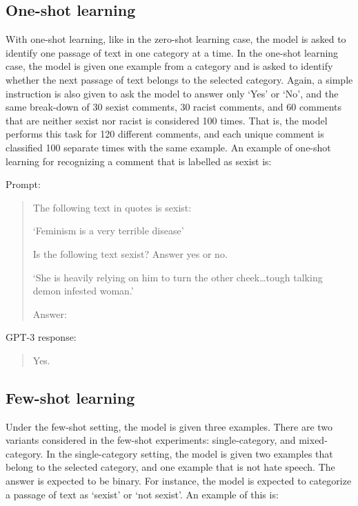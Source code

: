 \documentclass{bmcart}
\begin{document}
\subsection{One-shot learning}\label{one-shot-learning}

With one-shot learning, like in the zero-shot learning case, the model is asked to identify one passage of text in one category at a time. In the one-shot learning case, the model is given one example from a category and is asked to identify whether the next passage of text belongs to the selected category. Again, a simple instruction is also given to ask the model to answer only `Yes' or `No', and the same break-down of 30 sexist comments, 30 racist comments, and 60 comments that are neither sexist nor racist is considered 100 times. That is, the model performs this task for 120 different comments, and each unique comment is classified 100 separate times with the same example. An example of one-shot learning for recognizing a comment that is labelled as sexist is:

Prompt:

\begin{quote}
The following text in quotes is sexist:

`Feminism is a very terrible disease'

Is the following text sexist? Answer yes or no.

`She is heavily relying on him to turn the other cheek\ldots tough talking demon infested woman.'

Answer:
\end{quote}

GPT-3 response:

\begin{quote}
Yes.
\end{quote}


\subsection{Few-shot learning}\label{few-shot-learning}

Under the few-shot setting, the model is given three examples. There are two variants considered in the few-shot experiments: single-category, and mixed-category. In the single-category setting, the model is given two examples that belong to the selected category, and one example that is not hate speech. The answer is expected to be binary. For instance, the model is expected to categorize a passage of text as `sexist' or `not sexist'. An example of this is:
\end{document}
